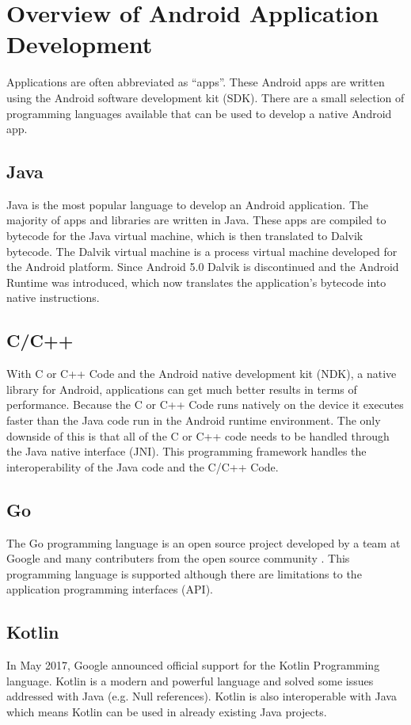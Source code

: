 \section{Overview of Android Application Development}
 Applications are often abbreviated as ``apps''. These Android apps are written using the Android software development kit (SDK). There are a small selection of programming languages available that can be used to develop a native Android app.

\subsection{Java}
Java is the most popular language to develop an Android application. The majority of apps and libraries are written in Java. These apps are compiled to bytecode for the Java virtual machine, which is then translated to Dalvik bytecode. The Dalvik virtual machine is a process virtual machine developed for the Android platform. Since Android 5.0 Dalvik is discontinued and the Android Runtime was introduced, which now translates the application's bytecode into native instructions.

\subsection{C/C++}
With C or C++ Code and the Android native development kit (NDK), a native library for Android, applications can get much better results in terms of performance. Because the C or C++ Code runs natively on the device it executes faster than the Java code run in the Android runtime environment. The only downside of this is that all of the C or C++ code needs to be handled through the Java native interface (JNI). This programming framework handles the interoperability of the Java code and the C/C++ Code.

\subsection{Go}
The Go programming language is an open source project developed by a team at Google and many contributers from the open source community \cite{GoProject}. This programming language is supported although there are limitations to the application programming interfaces (API).

\subsection{Kotlin}
In May 2017, Google announced official support for the Kotlin Programming language. Kotlin is a modern and powerful language and solved some issues addressed with Java (e.g. Null references). Kotlin is also interoperable with Java which means Kotlin can be used in already existing Java projects.

